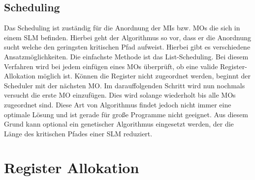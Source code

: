 \subsection{Scheduling}
\label{sec:scheduling}
Das Scheduling ist zuständig für die Anordnung der MIs bzw. MOs die sich in einem SLM befinden. Hierbei geht der Algorithmus so vor, dass er die Anordnung sucht welche den geringsten kritischen Pfad aufweist. Hierbei gibt es verschiedene Ansatzmöglichkeiten. Die einfachste Methode ist das List-Scheduling. Bei diesem Verfahren wird bei jedem einfügen eines MOs überprüft, ob eine valide Register-Allokation möglich ist. Können die Register nicht zugeordnet werden, beginnt der Scheduler mit der nächsten MO. Im darauffolgenden Schritt wird nun nochmals versucht die erste MO einzufügen. Dies wird solange wiederholt bis alle MOs zugeordnet sind.\cite{landskov1980local}
Diese Art von Algorithmus findet jedoch nicht immer eine optimale Lösung und ist gerade für große Programme nicht geeignet. Aus diesem Grund kann optional ein genetischer Algorithmus eingesetzt werden, der die Länge des kritischen Pfades einer SLM reduziert.


\section{Register Allokation}
\label{sec:register allok}
